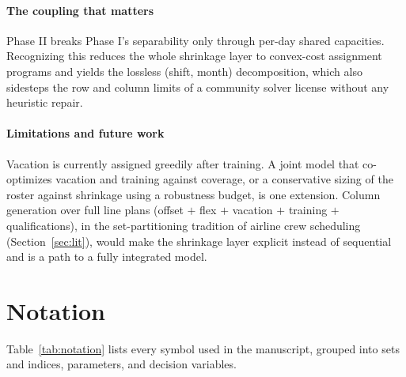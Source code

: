 \documentclass[preprint,12pt]{elsarticle}
\begin{document}
   \paragraph{The coupling that matters} Phase II breaks Phase I's separability only through per-day shared capacities. Recognizing this reduces the whole shrinkage layer to convex-cost assignment programs and yields the lossless (shift, month) decomposition, which also sidesteps the row and column limits of a community solver license without any heuristic repair.

   \paragraph{Limitations and future work} Vacation is currently assigned greedily after training. A joint model that co-optimizes vacation and training against coverage, or a conservative sizing of the roster against shrinkage using a robustness budget, is one extension. Column generation over full line plans (offset $+$ flex $+$ vacation $+$ training $+$ qualifications), in the set-partitioning tradition of airline crew scheduling (Section~\ref{sec:lit}), would make the shrinkage layer explicit instead of sequential and is a path to a fully integrated model.





\newpage
\appendix
\section{Notation}\label{app:notation}
   Table~\ref{tab:notation} lists every symbol used in the manuscript, grouped into sets and indices, parameters, and decision variables.
\end{document}
